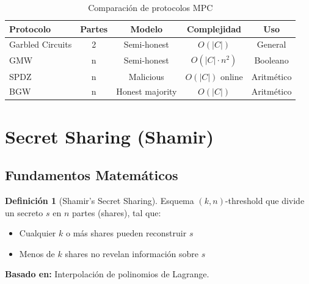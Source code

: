 \documentclass[11pt,a4paper,twoside]{book}
\theoremstyle{definition}
\newtheorem{definition}{Definición}[chapter]
\theoremstyle{remark}
\begin{document}
\begin{table}[htbp]
\centering
\small
\begin{tabular}{lcccc}
\toprule
\textbf{Protocolo} & \textbf{Partes} & \textbf{Modelo} & \textbf{Complejidad} & \textbf{Uso} \\
\midrule
Garbled Circuits & 2 & Semi-honest & $O(|C|)$ & General \\
GMW & n & Semi-honest & $O(|C| \cdot n^2)$ & Booleano \\
SPDZ & n & Malicious & $O(|C|)$ online & Aritmético \\
BGW & n & Honest majority & $O(|C|)$ & Aritmético \\
\bottomrule
\end{tabular}
\caption{Comparación de protocolos MPC}
\end{table}
\section{Secret Sharing (Shamir)}
\label{sec:secret-sharing}

\subsection{Fundamentos Matemáticos}

\begin{definition}[Shamir's Secret Sharing]
Esquema $(k, n)$-threshold que divide un secreto $s$ en $n$ partes (shares), tal que:
\begin{itemize}
    \item Cualquier $k$ o más shares pueden reconstruir $s$
    \item Menos de $k$ shares no revelan información sobre $s$
\end{itemize}

\textbf{Basado en:} Interpolación de polinomios de Lagrange.
\end{definition}
\end{document}
